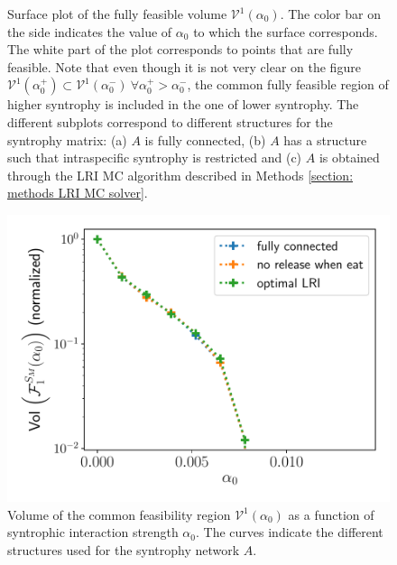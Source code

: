 \documentclass[12pt, titlepage]{report}
\begin{document}
\begin{figure}[h!]
\caption[caption for LOF]{Surface plot of the fully feasible volume $\mathcal{V}^1(\alpha_0)$. The color bar on the side indicates the value of $\alpha_0$ to which the surface corresponds. The white part of the plot corresponds to points that  are fully feasible. Note that even though it is not very clear on the figure $\mathcal{V}^1(\alpha_0^+) \subset \mathcal{V}^1(\alpha_0^-) \ \forall \alpha_0^+ > \alpha_0^-$, \ie the common fully feasible region of higher syntrophy is included in the one of lower syntrophy. The different subplots correspond to different structures for the syntrophy matrix: (a) $A$ is fully connected, (b) $A$ has a structure such that intraspecific syntrophy is restricted and (c) $A$ is obtained through the LRI MC algorithm described in Methods \ref{section: methods LRI MC solver}.} \label{fig: results feasibility cfv variation with syntrophy}
\end{figure}
\begin{figure}
\centering
\includegraphics[width=0.7\linewidth]{measure_common_feasibility_volume_varying_syntrophy}
\caption{Volume of the common feasibility region $\mathcal{V}^1(\alpha_0)$ as a function of syntrophic interaction strength $\alpha_0$. The curves indicate the different structures used for the syntrophy network $A$.}\label{fig: feasibility results volume of cfr depending on syntrophy}
\end{figure}
\end{document}
